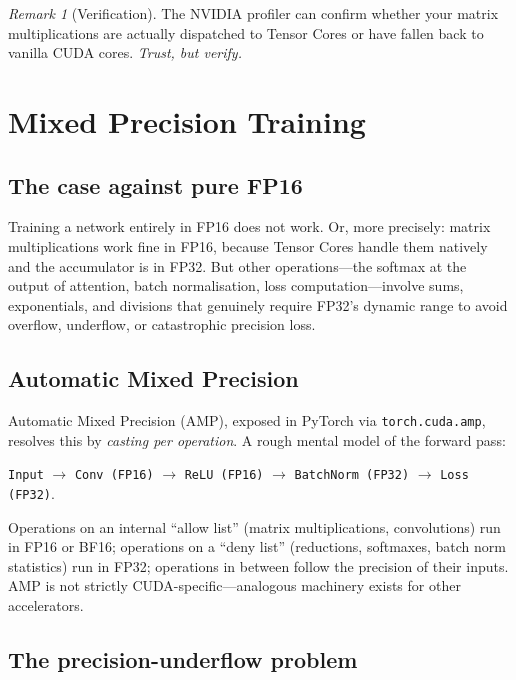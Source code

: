 \documentclass[11pt,a4paper]{article}
\theoremstyle{definition}
\theoremstyle{remark}
\newtheorem*{remark}{Remark}
\theoremstyle{plain}
\begin{document}
\begin{remark}[Verification]
The NVIDIA profiler can confirm whether your matrix multiplications are
actually dispatched to Tensor Cores or have fallen back to vanilla CUDA
cores. \emph{Trust, but verify.}
\end{remark}

\section{Mixed Precision Training}
\label{sec:amp}

\subsection{The case against pure FP16}

Training a network entirely in FP16 does not work. Or, more precisely:
matrix multiplications work fine in FP16, because Tensor Cores handle
them natively and the accumulator is in FP32. But other operations---the
softmax at the output of attention, batch normalisation, loss
computation---involve sums, exponentials, and divisions that genuinely
require FP32's dynamic range to avoid overflow, underflow, or
catastrophic precision loss.

\subsection{Automatic Mixed Precision}

Automatic Mixed Precision (AMP), exposed in PyTorch via
\texttt{torch.cuda.amp}, resolves this by \emph{casting per operation}. A
rough mental model of the forward pass:
\begin{center}
\texttt{Input} $\to$ \texttt{Conv (FP16)} $\to$ \texttt{ReLU (FP16)}
$\to$ \texttt{BatchNorm (FP32)} $\to$ \texttt{Loss (FP32)}.
\end{center}
Operations on an internal ``allow list'' (matrix multiplications,
convolutions) run in FP16 or BF16; operations on a ``deny list''
(reductions, softmaxes, batch norm statistics) run in FP32; operations in
between follow the precision of their inputs. AMP is not strictly
CUDA-specific---analogous machinery exists for other accelerators.

\subsection{The precision-underflow problem}
\end{document}
